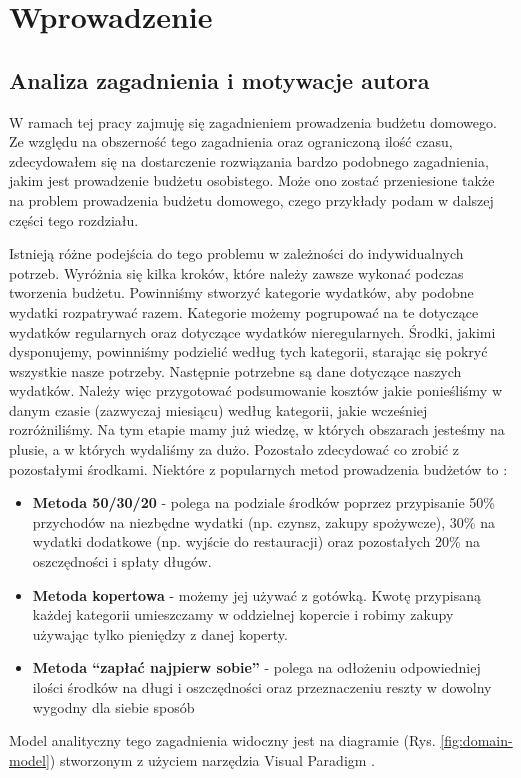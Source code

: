 \documentclass[shortabstract,inz]{iithesis}
\author         {Mateusz Kmita}
\begin{document}

\chapter{Wprowadzenie}
\section{Analiza zagadnienia i motywacje autora}
W ramach tej pracy zajmuję się zagadnieniem prowadzenia budżetu domowego. Ze względu na obszerność tego zagadnienia oraz ograniczoną ilość czasu, zdecydowałem się na dostarczenie rozwiązania bardzo podobnego zagadnienia, jakim jest prowadzenie budżetu osobistego. Może ono zostać przeniesione także na problem prowadzenia budżetu domowego, czego przykłady podam w dalszej części tego rozdziału.

Istnieją różne podejścia do tego problemu \citep{budgeting-methods} w zależności do indywidualnych potrzeb. Wyróżnia się kilka kroków, które należy zawsze wykonać podczas tworzenia budżetu. Powinniśmy stworzyć kategorie wydatków, aby podobne wydatki rozpatrywać razem. Kategorie możemy pogrupować na te dotyczące wydatków regularnych oraz dotyczące wydatków nieregularnych. Środki, jakimi dysponujemy, powinniśmy podzielić według tych kategorii, starając się pokryć wszystkie nasze potrzeby.   Następnie potrzebne są dane dotyczące naszych wydatków. Należy więc przygotować podsumowanie kosztów jakie ponieśliśmy w danym czasie (zazwyczaj miesiącu) według kategorii, jakie wcześniej rozróżniliśmy. Na tym etapie mamy już wiedzę, w których obszarach jesteśmy na plusie, a w których wydaliśmy za dużo. Pozostało zdecydować co zrobić z pozostałymi środkami.
Niektóre z popularnych metod prowadzenia budżetów to \citep{budgeting-examples}:
\begin{itemize}
	\item \textbf{Metoda 50/30/20} - polega na podziale środków poprzez przypisanie 50\% przychodów na niezbędne wydatki (np. czynsz, zakupy spożywcze), 30\% na wydatki dodatkowe (np. wyjście do restauracji) oraz pozostałych 20\% na oszczędności i spłaty długów.
	\item \textbf{Metoda kopertowa} - możemy jej używać z gotówką. Kwotę przypisaną każdej kategorii umieszczamy w oddzielnej kopercie i robimy zakupy używając tylko pieniędzy z danej koperty. 
	\item \textbf{Metoda ``zapłać najpierw sobie''} - polega na odłożeniu odpowiedniej ilości środków na długi i oszczędności oraz przeznaczeniu reszty w dowolny wygodny dla siebie sposób
\end{itemize}
Model analityczny tego zagadnienia widoczny jest na diagramie (Rys. \ref{fig:domain-model}) stworzonym z użyciem narzędzia Visual Paradigm \citep{visual-paradigm}.
\end{document}
